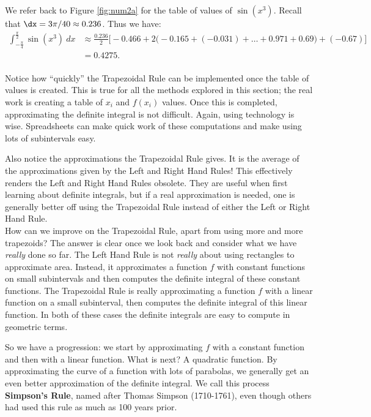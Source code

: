 {We refer back to Figure \ref{fig:num2a} for the table of values of $\sin(x^3)$. Recall that $\dx = 3\pi/40 \approx 0.236$. Thus we have:\small
\begin{align*}
\int_{-\frac{\pi}4}^{\frac{\pi}2} \sin (x^3)\ dx &\approx \frac{0.236}{2}\Big[-0.466 + 2\big(-0.165+(-0.031)+\ldots+0.971+0.69\big)+(-0.67)\Big]\\
			&= 0.4275.
\end{align*}
\normalsize
{}\baselineskip
}\\

Notice how ``quickly'' the Trapezoidal Rule can be implemented once the table of values is created. This is true for all the methods explored in this section; the real work is creating a table of $x_i$ and $f(x_i)$ values. Once this is completed, approximating the definite integral is not difficult. Again, using technology is wise. Spreadsheets can make quick work of these computations and make using lots of subintervals easy. 

Also notice the  approximations the Trapezoidal Rule gives. It is  the average of the approximations given by the Left and Right Hand Rules! This effectively renders the Left and Right Hand Rules obsolete. They are useful when first learning about definite integrals, but if a real approximation is needed, one is generally better off using the Trapezoidal Rule instead of either the Left or Right Hand Rule.\\

How can we improve on the Trapezoidal Rule, apart from using more and more trapezoids? The answer is clear once we look back and consider what we have \textit{really} done so far. The Left Hand Rule is not \textit{really} about using rectangles to approximate area. Instead, it approximates a function $f$ with constant functions on small subintervals and then computes the definite integral of these constant functions. The Trapezoidal Rule is really approximating a function $f$ with a linear function on a small subinterval, then computes the definite integral of this linear function. In both of these cases the definite integrals are easy to compute in geometric terms.

So we have a progression: we start by approximating $f$ with a constant function and then with a linear function. What is next? A quadratic function. By approximating the curve of a function with lots of parabolas, we generally get an even better approximation of the definite integral. We call this process \textbf{Simpson's Rule}, named after Thomas Simpson (1710-1761), even though others had used this rule as much as 100 years prior.\\

